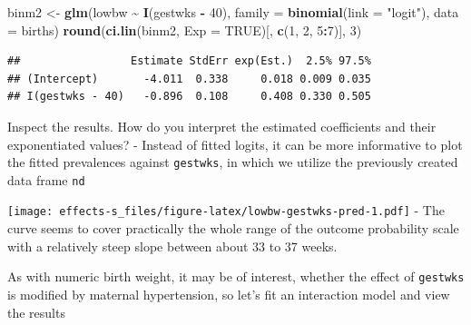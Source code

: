 \documentclass[
]{book}
\newenvironment{Shaded}{\begin{snugshade}}{\end{snugshade}}
\newcommand{\AttributeTok}[1]{\textcolor[rgb]{0.13,0.29,0.53}{#1}}
\newcommand{\ConstantTok}[1]{\textcolor[rgb]{0.56,0.35,0.01}{#1}}
\newcommand{\DecValTok}[1]{\textcolor[rgb]{0.00,0.00,0.81}{#1}}
\newcommand{\FunctionTok}[1]{\textcolor[rgb]{0.13,0.29,0.53}{\textbf{#1}}}
\newcommand{\NormalTok}[1]{#1}
\newcommand{\OtherTok}[1]{\textcolor[rgb]{0.56,0.35,0.01}{#1}}
\newcommand{\SpecialCharTok}[1]{\textcolor[rgb]{0.81,0.36,0.00}{\textbf{#1}}}
\newcommand{\StringTok}[1]{\textcolor[rgb]{0.31,0.60,0.02}{#1}}
\begin{document}
\begin{Shaded}
\begin{Highlighting}[]
\NormalTok{binm2 }\OtherTok{\textless{}{-}} \FunctionTok{glm}\NormalTok{(lowbw }\SpecialCharTok{\textasciitilde{}} \FunctionTok{I}\NormalTok{(gestwks }\SpecialCharTok{{-}} \DecValTok{40}\NormalTok{), }\AttributeTok{family =} \FunctionTok{binomial}\NormalTok{(}\AttributeTok{link =} \StringTok{"logit"}\NormalTok{), }\AttributeTok{data =}\NormalTok{ births)}
\FunctionTok{round}\NormalTok{(}\FunctionTok{ci.lin}\NormalTok{(binm2, }\AttributeTok{Exp =} \ConstantTok{TRUE}\NormalTok{)[, }\FunctionTok{c}\NormalTok{(}\DecValTok{1}\NormalTok{, }\DecValTok{2}\NormalTok{, }\DecValTok{5}\SpecialCharTok{:}\DecValTok{7}\NormalTok{)], }\DecValTok{3}\NormalTok{)}
\end{Highlighting}
\end{Shaded}

\begin{verbatim}
##                 Estimate StdErr exp(Est.)  2.5% 97.5%
## (Intercept)       -4.011  0.338     0.018 0.009 0.035
## I(gestwks - 40)   -0.896  0.108     0.408 0.330 0.505
\end{verbatim}

Inspect the results. How do you interpret the estimated coefficients
and their exponentiated values?
-
Instead of fitted logits, it can be more informative
to plot the fitted prevalences against \texttt{gestwks},
in which we utilize the previously created data frame \texttt{nd}

\begin{Shaded}
\end{Shaded}

\texttt{[image: effects-s\_files/figure-latex/lowbw-gestwks-pred-1.pdf]}
- The curve seems to cover practically the whole range of
the outcome probability scale with a relatively
steep slope between about 33 to 37 weeks.

As with numeric birth weight, it may be of interest,
whether the effect of \texttt{gestwks} is modified
by maternal hypertension, so let's fit
an interaction model and view the results
\end{document}
